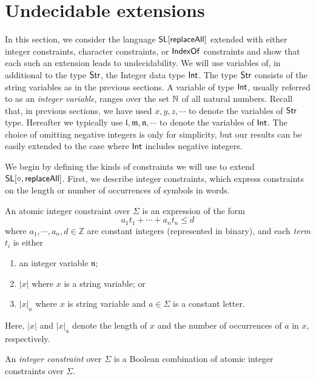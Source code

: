 
\section{Undecidable extensions}\label{sec-ext}

In this section, we consider the language $\mathsf{SL}[\mathsf{replaceAll}]$ extended with either integer constraints, character constraints, or $\mathsf{IndexOf}$ constraints and show that each such an extension leads to undecidability. 
We will use variables of, in additional to the type ${\sf Str}$, the Integer data type ${\sf Int}$. The type ${\sf Str}$ consists of the string variables as in the previous sections. A variable of type ${\sf Int}$, usually referred to as an \emph{integer variable}, ranges over the set $\mathbb{N}$ of all natural numbers. Recall that, in previous sections, we have used $x, y, z, \cdots$ to denote the variables of ${\sf Str}$ type.  Hereafter we typically use $\mathfrak{l}, \mathfrak{m}, \mathfrak{n}, \cdots$ to denote the variables of ${\sf Int}$. The
choice of omitting negative integers is only for simplicity, but our
results can be easily extended to the case where ${\sf Int}$ includes negative integers.

We begin by defining the kinds of constraints we will use to extend $\mathsf{SL}[\circ,\mathsf{replaceAll}]$.
First, we describe integer constraints, which express constraints on the length or number of occurrences of symbols in words. 


\begin{definition} \label{def:intconst} 
	An atomic integer constraint over $\Sigma$ is an expression of the form
	\[a_1t_1+\cdots+a_nt_n\leq d\]
where $a_1, \cdots, a_n,d\in \mathbb{Z}$ are constant integers (represented in binary), and each \emph{term} $t_i$ is either 
	\begin{enumerate}
		\item an integer variable $\mathfrak{n}$;
		\item $|x|$ where $x$ is a  string variable; or 
		\item $|x|_a$ where $x$ is string variable and $a\in \Sigma$ is a constant letter.
	\end{enumerate}
Here, $|x|$ and $|x|_a$ denote the length of $x$ and the number of occurrences of $a$ in $x$, respectively. 

An \emph{integer constraint} over $\Sigma$ is a Boolean combination of atomic integer constraints over $\Sigma$.
\end{definition}


